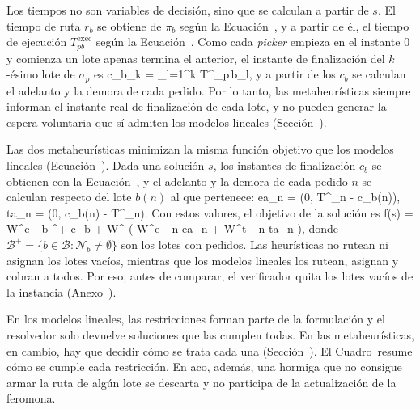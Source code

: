 Los tiempos no son variables de decisión, sino que se calculan a partir de
$s$. El tiempo de ruta $r_b$ se obtiene de $\pi_b$ según la
Ecuación~, y a partir de él, el tiempo de ejecución
$T^{\text{exec}}_{pb}$ según la Ecuación~\in[eq:texec]. Como cada
{\em picker} empieza en el instante 0 y comienza un lote apenas termina el
anterior, el instante de finalización del $k$-ésimo lote de $\sigma_p$ es
\startplaceformula[reference=eq:hc_finalizacion]
\startformula
	c_{b_k} = \sum_{l=1}^{k} T^{}_{p\,b_l},
\stopformula
\stopplaceformula
y a partir de los $c_b$ se calculan el adelanto y la demora de cada pedido.
Por lo tanto, las metaheurísticas siempre informan el instante real de
finalización de cada lote, y no pueden generar la espera voluntaria que sí
admiten los modelos lineales (Sección~).

\stopsubsection

\startsubsection[title={Función de evaluación y restricciones}, reference=sec:heur_evaluacion]

Las dos metaheurísticas minimizan la misma función objetivo que los modelos
lineales (Ecuación~). Dada una solución $s$, los
instantes de finalización $c_b$ se obtienen con la
Ecuación~\in[eq:hc_finalizacion], y el adelanto y la demora de cada pedido $n$
se calculan respecto del lote $b(n)$ al que pertenece:
\startformula
	ea_n = \max\left(0,\; T^{}_n - c_{b(n)}\right), \qquad
	ta_n = \max\left(0,\; c_{b(n)} - T^{}_n\right).
\stopformula
Con estos valores, el objetivo de la solución es
\startplaceformula[reference=eq:hc_objetivo]
\startformula
	f(s) = W^{c} \sum_{b \in {}^{+}} c_b \;+\; W^{} \left( W^{e} \sum_{n \in {}} ea_n + W^{t} \sum_{n \in {}} ta_n \right),
\stopformula
\stopplaceformula
donde $\mathcal{B}^{+} = \{ b \in \mathcal{B} : \mathcal{N}_b \neq \emptyset \}$
son los lotes con pedidos. Las heurísticas no rutean ni asignan los lotes
vacíos, mientras que los modelos lineales los rutean, asignan y cobran a
todos. Por eso, antes de comparar, el verificador quita los lotes vacíos de
la instancia (Anexo~).

En los modelos lineales, las restricciones forman parte de la formulación y
el resolvedor solo devuelve soluciones que las cumplen todas. En las
metaheurísticas, en cambio, hay que decidir cómo se trata cada una
(Sección~). El Cuadro~
resume cómo se cumple cada restricción. En \ac{aco}, además, una hormiga que
no consigue armar la ruta de algún lote se descarta y no participa de la
actualización de la feromona.

